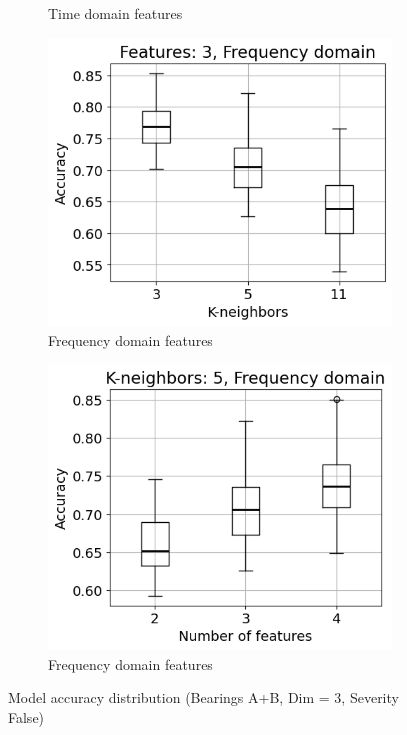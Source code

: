 \begin{figure}[h]
\begin{subfigure}[b]{0.48\textwidth}
        \caption{Time domain features}
    \end{subfigure}
    \hfill
    \begin{subfigure}[b]{0.48\textwidth}
        \includegraphics[width=\textwidth]{assets/results/feature-combinations/FD-3-A+B-False-False-F3.png}
        \caption{Frequency domain features}
    \end{subfigure}
    \hfill
    \begin{subfigure}[b]{0.48\textwidth}
        \includegraphics[width=\textwidth]{assets/results/feature-combinations/FD-3-A+B-False-False-K5.png}
        \caption{Frequency domain features}
    \end{subfigure}
    \caption{Model accuracy distribution (Bearings A+B, Dim = 3, Severity False)}
\end{figure}


